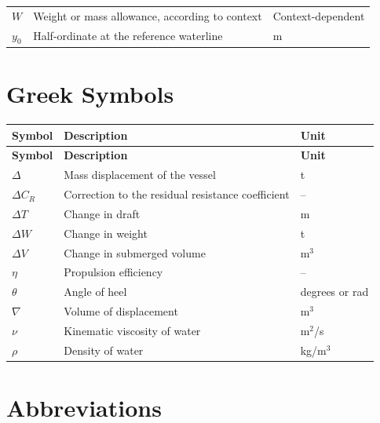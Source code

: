 \begin{appendices}
\begin{longtable}{@{}p{}
                      p{}
                      p{}@{}}
$W$ & Weight or mass allowance, according to context & Context-dependent \\

$y_0$ & Half-ordinate at the reference waterline & m \\


\end{longtable}

\section*{Greek Symbols}

\begin{longtable}{@{}p{}
                      p{}
                      p{}@{}}
\toprule
\textbf{Symbol} & \textbf{Description} & \textbf{Unit} \\
\midrule
\endfirsthead

\toprule
\textbf{Symbol} & \textbf{Description} & \textbf{Unit} \\
\midrule
\endhead

\bottomrule
\endfoot

$\Delta$ & Mass displacement of the vessel & t \\
$\Delta C_R$ & Correction to the residual resistance coefficient & -- \\
$\Delta T$ & Change in draft & m \\
$\Delta W$ & Change in weight & t \\
$\Delta V$ & Change in submerged volume & m$^3$ \\

$\eta$ & Propulsion efficiency & -- \\

$\theta$ & Angle of heel & degrees or rad \\
$\nabla$ & Volume of displacement & m$^3$ \\

$\nu$ & Kinematic viscosity of water & m$^2$/s \\
$\rho$ & Density of water & kg/m$^3$ \\

\end{longtable}

\section*{Abbreviations}


\end{appendices}
